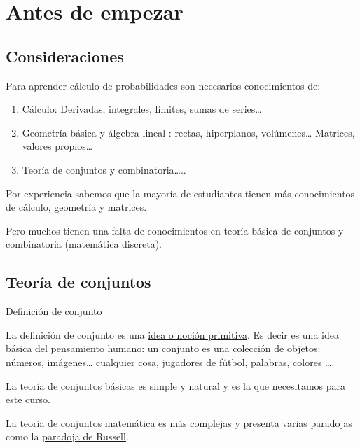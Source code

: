 \documentclass[]{book}
\providecommand{\tightlist}{%
  \setlength{\itemsep}{0pt}\setlength{\parskip}{0pt}}
\begin{document}
\hypertarget{antes-de-empezar}{%
\section{Antes de empezar}\label{antes-de-empezar}}

\hypertarget{consideraciones}{%
\subsection{Consideraciones}\label{consideraciones}}

Para aprender cálculo de probabilidades son necesarios conocimientos de:

\begin{enumerate}
\def\labelenumi{\arabic{enumi}.}
\tightlist
\item
  Cálculo: Derivadas, integrales, límites, sumas de series\ldots{}
\item
  Geometría básica y álgebra lineal : rectas, hiperplanos, volúmenes\ldots{} Matrices, valores propios\ldots{}
\item
  Teoría de conjuntos y combinatoria\ldots{}..
\end{enumerate}

Por experiencia sabemos que la mayoría de estudiantes tienen más conocimientos de cálculo, geometría y matrices.

Pero muchos tienen una falta de conocimientos en teoría básica de conjuntos y combinatoria (matemática discreta).

\hypertarget{teoruxeda-de-conjuntos}{%
\subsection{Teoría de conjuntos}\label{teoruxeda-de-conjuntos}}

 Definición de conjunto

La definición de conjunto es una \href{https://es.wikipedia.org/wiki/Concepto_primitivo}{idea o noción primitiva}. Es decir es una idea básica del pensamiento humano: un conjunto es una colección de objetos: números, imágenes\ldots{} cualquier cosa, jugadores de fútbol, palabras, colores \ldots{}.

La teoría de conjuntos básicas es simple y natural y es la que necesitamos para este curso.

La teoría de conjuntos matemática es más complejas y presenta varias paradojas como la \href{https://es.wikipedia.org/wiki/Paradoja_de_Russell}{paradoja de Russell}.
\end{document}
